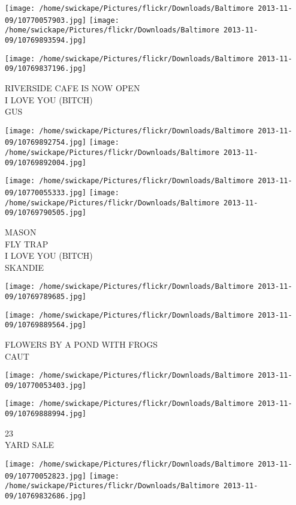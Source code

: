 \documentclass[10pt,letterpaper]{article}
\begin{document}
\texttt{[image: /home/swickape/Pictures/flickr/Downloads/Baltimore 2013-11-09/10770057903.jpg]}
\texttt{[image: /home/swickape/Pictures/flickr/Downloads/Baltimore 2013-11-09/10769893594.jpg]}

\vspace{0.25in}
\texttt{[image: /home/swickape/Pictures/flickr/Downloads/Baltimore 2013-11-09/10769837196.jpg]}

RIVERSIDE CAFE IS NOW OPEN\\
I LOVE YOU (BITCH)\\
GUS
\pagebreak

\texttt{[image: /home/swickape/Pictures/flickr/Downloads/Baltimore 2013-11-09/10769892754.jpg]}
\texttt{[image: /home/swickape/Pictures/flickr/Downloads/Baltimore 2013-11-09/10769892004.jpg]}

\texttt{[image: /home/swickape/Pictures/flickr/Downloads/Baltimore 2013-11-09/10770055333.jpg]}
\texttt{[image: /home/swickape/Pictures/flickr/Downloads/Baltimore 2013-11-09/10769790505.jpg]}

MASON\\
FLY TRAP\\
I LOVE YOU (BITCH)\\
SKANDIE
\pagebreak

\texttt{[image: /home/swickape/Pictures/flickr/Downloads/Baltimore 2013-11-09/10769789685.jpg]}

\vspace{0.25in}
\texttt{[image: /home/swickape/Pictures/flickr/Downloads/Baltimore 2013-11-09/10769889564.jpg]}

FLOWERS BY A POND WITH FROGS\\
CAUT
\pagebreak

\texttt{[image: /home/swickape/Pictures/flickr/Downloads/Baltimore 2013-11-09/10770053403.jpg]}

\vspace{0.25in}
\texttt{[image: /home/swickape/Pictures/flickr/Downloads/Baltimore 2013-11-09/10769888994.jpg]}

23\\
YARD SALE
\pagebreak

\texttt{[image: /home/swickape/Pictures/flickr/Downloads/Baltimore 2013-11-09/10770052823.jpg]}
\texttt{[image: /home/swickape/Pictures/flickr/Downloads/Baltimore 2013-11-09/10769832686.jpg]}
\end{document}
